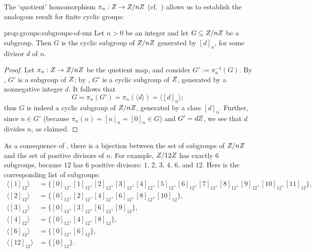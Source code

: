 The `quotient' homomorphism $\pi_n : Z \to Z/nZ$ (cf.\
) allows us to establish the analogous
result for finite cyclic groups:

\begin{prop}{}{prop:groups:subgroups-of-znz}
  Let $n > 0$ be an integer and let $G \subseteq Z/nZ$ be
    a subgroup. Then $G$ is the cyclic subgroup of $Z/nZ$ generated
    by $[d]_n$, for some divisor $d$ of
    $n$.
\end{prop}
\begin{proof}
  Let $\pi_n : Z \to Z/nZ$ be the quotient map, and consider
  $G' := \pi_n^{-1}(G)$. By
  , $G'$ is a subgroup of
  $Z$; by , $G'$ is a
  cyclic subgroup of $Z$, generated by a nonnegative integer $d$.  It
  follows that
  \[
    G = \pi_n(G') = \pi_n(\langle d \rangle) = \langle [d]_n \rangle;
  \]
  thus $G$ is indeed a cyclic subgroup of $Z/nZ$, generated by a
  class $[d]_n$. Further, since $n \in G'$ (because
  $\pi_n(n) = [n]_n = [0]_n \in G$) and $G' = dZ$, we see that $d$
  divides $n$, as claimed.
\end{proof}

As a consequence of ,
there is a bijection between the set of subgroups of $Z/nZ$ and the
set of positive divisors of $n$. For example, $Z/12Z$ has exactly
$6$ subgroups, because $12$ has $6$ positive divisors: $1$, $2$, $3$,
$4$, $6$, and $12$. Here is the corresponding list of subgroups:
\begin{align*}
  \langle [1]_{12} \rangle &= \{[0]_{12}, [1]_{12}, [2]_{12}, [3]_{12},
                             [4]_{12}, [5]_{12}, [6]_{12}, [7]_{12}, [8]_{12}, [9]_{12}, [10]_{12},
                             [11]_{12}\}, \\
  \langle [2]_{12} \rangle &= \{[0]_{12}, [2]_{12}, [4]_{12}, [6]_{12},
                             [8]_{12}, [10]_{12}\}, \\
  \langle [3]_{12} \rangle &= \{[0]_{12}, [3]_{12}, [6]_{12}, [9]_{12}\}, \\
  \langle [4]_{12} \rangle &= \{[0]_{12}, [4]_{12}, [8]_{12}\}, \\
  \langle [6]_{12} \rangle &= \{[0]_{12}, [6]_{12}\}, \\
  \langle [12]_{12} \rangle &= \{[0]_{12}\}.
\end{align*}

